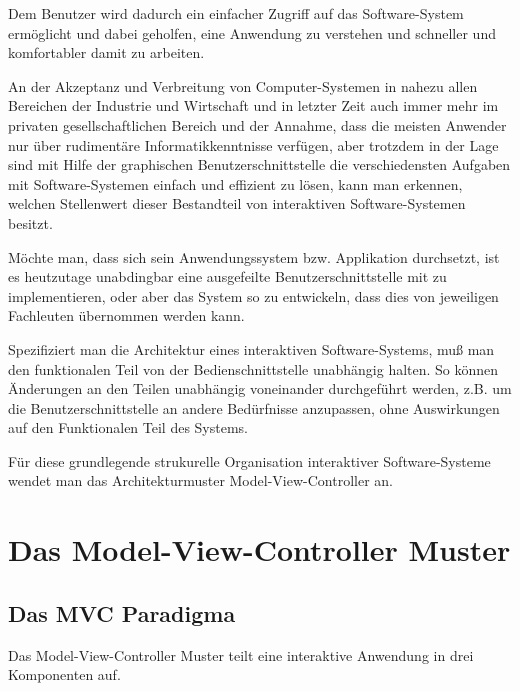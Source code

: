 \documentclass[11pt,a4paper,titlepage]{scrreprt}
\begin{document}
Dem Benutzer wird dadurch ein einfacher Zugriff auf das Software-System ermöglicht und
dabei geholfen, eine Anwendung zu verstehen und schneller und komfortabler damit zu arbeiten.

An der Akzeptanz und Verbreitung von Computer-Systemen in nahezu allen Bereichen der Industrie
und Wirtschaft und in letzter Zeit auch immer mehr im privaten gesellschaftlichen Bereich und
der Annahme, dass die meisten Anwender nur über rudimentäre
Informatikkenntnisse verfügen, aber trotzdem in der Lage sind mit Hilfe der graphischen
Benutzerschnittstelle die verschiedensten Aufgaben mit Software-Systemen einfach und effizient
zu lösen, kann man erkennen, welchen Stellenwert dieser Bestandteil von interaktiven
Software-Systemen besitzt.

Möchte man, dass sich sein Anwendungssystem bzw. Applikation durchsetzt, ist es heutzutage
unabdingbar eine ausgefeilte Benutzerschnittstelle mit zu implementieren, oder aber 
das System so zu entwickeln, dass dies von jeweiligen Fachleuten übernommen werden kann.

Spezifiziert man die Architektur eines interaktiven Software-Systems, muß man den funktionalen
Teil von der Bedienschnittstelle unabhängig halten. So können Änderungen an den Teilen
unabhängig voneinander durchgeführt werden, z.B. um die Benutzerschnittstelle an andere
Bedürfnisse anzupassen, ohne Auswirkungen auf den Funktionalen Teil des Systems.

Für diese grundlegende strukurelle Organisation interaktiver Software-Systeme wendet man
das Architekturmuster Model-View-Controller an.

\chapter{Das Model-View-Controller Muster}
\section{Das MVC Paradigma}
Das Model-View-Controller Muster teilt eine interaktive Anwendung in drei Komponenten auf.
\end{document}
